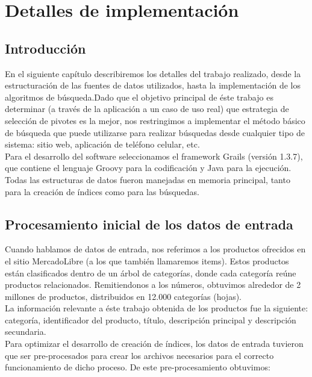 	\chapter{Detalles de implementaci\'on}

\section{Introducci\'on}

En el siguiente cap\'itulo describiremos los detalles del trabajo realizado, desde la estructuraci\'on de las fuentes de datos utilizados, hasta la implementaci\'on de los algoritmos de b\'usqueda.Dado que el objetivo principal de \'este trabajo es determinar (a trav\'es de la aplicaci\'on a un caso de uso real) que estrategia de selecci\'on de pivotes es la mejor, nos restringimos a implementar el m\'etodo b\'asico de b\'usqueda que puede utilizarse para realizar b\'usquedas desde cualquier tipo de sistema: sitio web, aplicaci\'on de tel\'efono celular, etc.\\

Para el desarrollo del software seleccionamos el framework Grails (versi\'on 1.3.7), que contiene el lenguaje Groovy para la codificaci\'on y Java para la ejecuci\'on.\\

Todas las estructuras de datos fueron manejadas en memoria principal, tanto para la creaci\'on de \'indices como para las b\'usquedas.


\section{Procesamiento inicial de los datos de entrada}

Cuando hablamos de datos de entrada, nos referimos a los productos ofrecidos en el sitio MercadoLibre (a los que tambi\'en llamaremos items). Estos productos est\'an clasificados dentro de un \'arbol de categor\'ias, donde cada categor\'ia re\'une productos relacionados. Remitiendonos a los n\'umeros, obtuvimos alrededor de 2 millones de productos, distribuidos en 12.000 categor\'ias (hojas).\\

La informaci\'on relevante a \'este trabajo obtenida de los productos fue la siguiente: categor\'ia, identificador del producto, t\'itulo, descripci\'on principal y descripci\'on secundaria.\\

Para optimizar el desarrollo de creaci\'on de \'indices, los datos de entrada tuvieron que ser pre-procesados para crear los archivos necesarios para el correcto funcionamiento de dicho proceso. De este pre-procesamiento obtuvimos:\\

